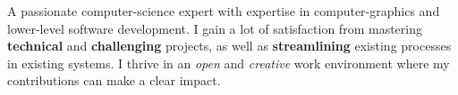 

\begin{cvparagraph}
	A passionate computer-science expert with expertise in computer-graphics and lower-level software development. I gain a lot of satisfaction from mastering \textbf{technical} and \textbf{challenging} projects, as well as \textbf{streamlining} existing processes in existing systems. I thrive in an \textit{open} and \textit{creative} work environment where my contributions can make a clear impact.
\end{cvparagraph}


